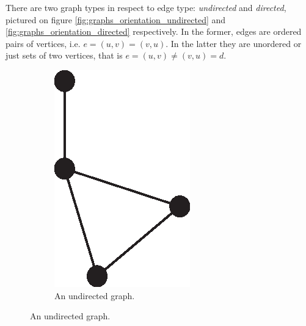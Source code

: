       There are two graph types in respect to edge type: \emph{undirected} and \emph{directed}, pictured on figure \ref{fig:graphs_orientation_undirected} and \ref{fig:graphs_orientation_directed} respectively. In the former, edges are ordered pairs of vertices, i.e. $e = (u, v) = (v, u)$. In the latter they are unordered or just sets of two vertices, that is $e = (u, v) \neq (v, u) = d$.
      \begin{figure}[H]
        \centering        
          \begin{subfigure}[b]{0.25\textwidth}
            \includegraphics[width=\textwidth]{chapters/02_problem_definition/graph_undirected}
            \caption{An undirected graph.}

\end{subfigure}
\end{figure}
